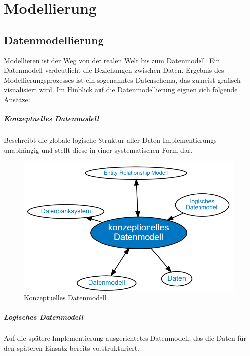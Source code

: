 \chapter{Modellierung}\label{cha:modellierung}

\section{Datenmodellierung}

Modellieren ist der Weg von der realen Welt bis zum Datenmodell. Ein Datenmodell verdeutlicht die Beziehungen zwischen Daten. Ergebnis des Modellierungsprozesses ist ein sogenanntes Datenschema, das zumeist grafisch visualisiert wird.
Im Hinblick auf die Datenmodellierung eignen sich folgende Ansätze:

\paragraph{Konzeptuelles Datenmodell}
Beschreibt die globale logische Struktur aller Daten Implementierungs-unabhängig und stellt diese in einer systematischen Form dar.

\begin{figure}[H]
    \centering
    \includegraphics[width=.75\textwidth]{Content/images/modellierung/konzeptionell.png}
    \caption{Konzeptuelles Datenmodell}
    \label{fig:modellierung:konzeptuell}
 \end{figure}

 \paragraph{Logisches Datenmodell}
 Auf die spätere Implementierung ausgerichtetes Datenmodell, das die Daten für den späteren Einsatz bereits vorstrukturiert.

